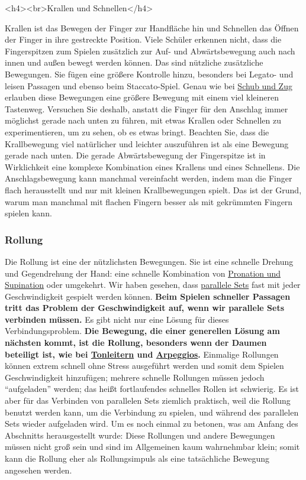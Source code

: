 <h4><br>Krallen und Schnellen</h4>

Krallen ist das Bewegen der Finger zur Handfläche hin und Schnellen das Öffnen der Finger in ihre gestreckte Position.
Viele Schüler erkennen nicht, dass die Fingerspitzen zum Spielen zusätzlich zur Auf- und Abwärtsbewegung auch nach innen und außen bewegt werden können.
Das sind nützliche zusätzliche Bewegungen.
Sie fügen eine größere Kontrolle hinzu, besonders bei Legato- und leisen Passagen und ebenso beim Staccato-Spiel.
Genau wie bei \hyperlink{c1iii4SchubZug}{Schub und Zug} erlauben diese Bewegungen eine größere Bewegung mit einem viel kleineren Tastenweg.
Versuchen Sie deshalb, anstatt die Finger für den Anschlag immer möglichst gerade nach unten zu führen, mit etwas Krallen oder Schnellen zu experimentieren, um zu sehen, ob es etwas bringt.
Beachten Sie, dass die Krallbewegung viel natürlicher und leichter auszuführen ist als eine Bewegung gerade nach unten.
Die gerade Abwärtsbewegung der Fingerspitze ist in Wirklichkeit eine komplexe Kombination eines Krallens und eines Schnellens.
Die Anschlagsbewegung kann manchmal vereinfacht werden, indem man die Finger flach herausstellt und nur mit kleinen Krallbewegungen spielt.
Das ist der Grund, warum man manchmal mit flachen Fingern besser als mit gekrümmten Fingern spielen kann.


\subsubsection{Rollung}\hypertarget{Rollung}{}

Die Rollung ist eine der nützlichsten Bewegungen.
Sie ist eine schnelle Drehung und Gegendrehung der Hand: eine schnelle Kombination von \hyperlink{c1iii4ProSup}{Pronation und Supination} oder umgekehrt.
Wir haben gesehen, dass \hyperlink{c1ii11}{parallele Sets} fast mit jeder Geschwindigkeit gespielt werden können.
\textbf{Beim Spielen schneller Passagen tritt das Problem der Geschwindigkeit auf, wenn wir parallele Sets verbinden müssen.}
Es gibt nicht nur eine Lösung für dieses Verbindungsproblem.
\textbf{Die Bewegung, die einer generellen Lösung am nächsten kommt, ist die Rollung, besonders wenn der Daumen beteiligt ist, wie bei \hyperlink{c1iii5a}{Tonleitern} und \hyperlink{Arpeggios}{Arpeggios}.}
Einmalige Rollungen können extrem schnell ohne Stress ausgeführt werden und somit dem Spielen Geschwindigkeit hinzufügen; mehrere schnelle Rollungen müssen jedoch \enquote{aufgeladen} werden; das heißt fortlaufendes schnelles Rollen ist schwierig.
Es ist aber für das Verbinden von parallelen Sets ziemlich praktisch, weil die Rollung benutzt werden kann, um die Verbindung zu spielen, und während des parallelen Sets wieder aufgeladen wird.
Um es noch einmal zu betonen, was am Anfang des Abschnitts herausgestellt wurde: Diese Rollungen und andere Bewegungen müssen nicht groß sein und sind im Allgemeinen kaum wahrnehmbar klein; somit kann die Rollung eher als Rollungsimpuls als eine tatsächliche Bewegung angesehen werden.


